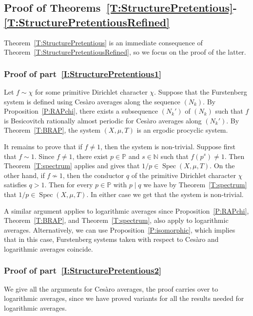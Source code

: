 \documentclass[11pt]{amsart}
\theoremstyle{definition}
\newcommand{\N}{{\mathbb N}}
\renewcommand{\P}{{\mathbb P}}
\newcommand{\R}{{\mathbb R}}
\DeclareMathOperator{\spec}{Spec}
\begin{document}
 \subsection{Proof of Theorems~\ref{T:StructurePretentious}-\ref{T:StructurePretentiousRefined}}\label{SS:ProofPretentious}
Theorem~\ref{T:StructurePretentious} is an immediate consequence of
Theorem~\ref{T:StructurePretentiousRefined}, so we focus on the proof of the latter.



\subsubsection{Proof of part~\eqref{I:StructurePretentious1}}
Let $f\sim \chi$ for some primitive Dirichlet character $\chi$.
Suppose that the  Furstenberg system is
 defined using Ces\`aro averages along the sequence $(N_k)$.
By  Proposition~\ref{P:RAPchi}, there exists a subsequence $(N_k')$ of $(N_k)$ such that $f$ is Besicovitch rationally almost periodic for Ces\`aro averages along $(N_k')$. By Theorem~\ref{T:BRAP}, the system $(X,\mu,T)$ is an ergodic procyclic system.


 It remains to prove that if $f\neq 1$, then the system is non-trivial.
Suppose first that $f\sim 1$. Since $f\neq 1$, there exist $p\in \P$ and $s\in \N$ such that $f(p^s)\neq 1$. Then Theorem~\ref{T:spectrum} applies and gives that $1/p\in \spec(X,\mu,T)$. 
On the other hand, if $f\not\sim 1$, then the conductor $q$ of the primitive Dirichlet character $\chi$  satisfies $q>1$. Then for every $p\in \P$ with $p\mid q$ we have by  Theorem~\ref{T:spectrum} that $1/p\in \spec(X,\mu,T)$.
In either case we get that the  system is non-trivial.



A similar argument applies to  logarithmic averages since Proposition~\ref{P:RAPchi},
Theorem~\ref{T:BRAP}, and Theorem~\ref{T:spectrum},  also  apply to logarithmic averages. Alternatively, we can use Proposition~\ref{P:isomorphic}, which implies that in this case, Furstenberg systems taken with respect to Ces\`aro and logarithmic averages coincide.


\subsubsection{Proof of part~\eqref{I:StructurePretentious2}}
 We give all the arguments for Ces\`aro averages, the proof carries over to logarithmic averages, since we have proved variants for  all the results needed for logarithmic averages.
\end{document}
